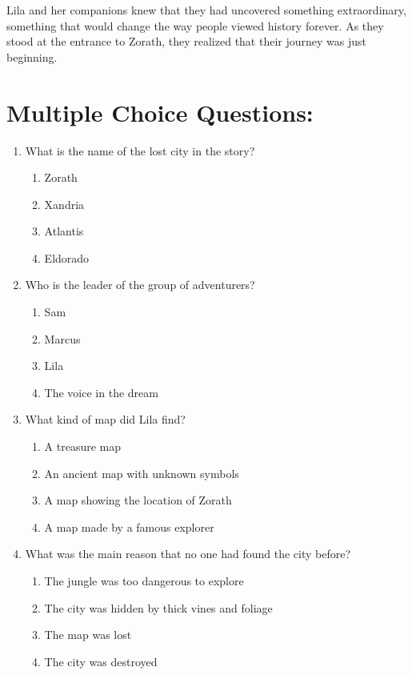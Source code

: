 \documentclass[12pt]{article}
\begin{document}
Lila and her companions knew that they had uncovered something extraordinary, something that would change the way people viewed history forever. As they stood at the entrance to Zorath, they realized that their journey was just beginning.

\newpage

\section*{Multiple Choice Questions:}

\begin{enumerate}

\item What is the name of the lost city in the story?
\begin{enumerate}[label=\Alph*.]
    \item Zorath
    \item Xandria
    \item Atlantis
    \item Eldorado
\end{enumerate}

\vspace{0.5cm}

\item Who is the leader of the group of adventurers?
\begin{enumerate}[label=\Alph*.]
    \item Sam
    \item Marcus
    \item Lila
    \item The voice in the dream
\end{enumerate}

\vspace{0.5cm}

\item What kind of map did Lila find?
\begin{enumerate}[label=\Alph*.]
    \item A treasure map
    \item An ancient map with unknown symbols
    \item A map showing the location of Zorath
    \item A map made by a famous explorer
\end{enumerate}

\vspace{0.5cm}

\item What was the main reason that no one had found the city before?
\begin{enumerate}[label=\Alph*.]
    \item The jungle was too dangerous to explore
    \item The city was hidden by thick vines and foliage
    \item The map was lost
    \item The city was destroyed
\end{enumerate}


\end{enumerate}
\end{document}
